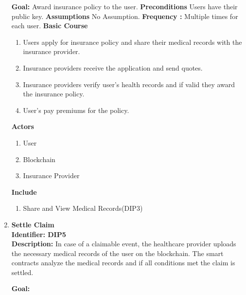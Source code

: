 \begin{enumerate}
	      \textbf{Goal:} 	Award insurance policy to the user.
	      \textbf{Preconditions} Users have their public key.
	      \newline
	      \textbf{Assumptions} No Assumption.
	      \textbf{Frequency :} Multiple times for each user.\newline
	      \textbf{Basic Course}
	      \begin{enumerate}
	      	\item	Users apply for insurance policy and share their medical records with the insurance provider.
	      	\item	Insurance providers receive the application and send quotes.
	      	\item  	Insurance providers verify user’s health records and if valid they award the insurance policy.
	      	\item 	User’s pay premiums for the policy.
	      \end{enumerate}
	      \textbf{Actors}
	      \begin{enumerate}
	      	\item User
	      	\item Blockchain
	      	\item Insurance Provider
	      \end{enumerate} 
	      \textbf{Include}
	      \begin{enumerate}
	      	\item Share and View Medical Records(DIP3)
	      \end{enumerate} 
	      	              
	\item \textbf{Settle Claim} \\
	      \textbf{Identifier: DIP5} \\
	      \textbf{Description:} In case of a claimable event, the healthcare provider uploads the necessary medical records of the user on the blockchain. The smart contracts analyze the medical records and if all conditions met the claim is settled.
	      	      
	      	                      
	      \textbf{Goal:} 		
	      	      

\end{enumerate}
